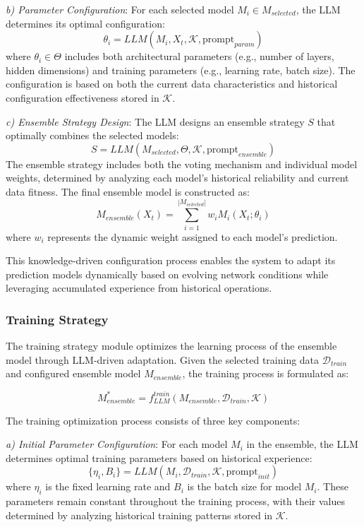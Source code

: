 \documentclass[conference]{IEEEtran}
\begin{document}
\textit{b) Parameter Configuration}: For each selected model $M_i \in M_{selected}$, the LLM determines its optimal configuration:
\begin{equation}
    \theta_i = LLM(M_i, X_t, \mathcal{K}, \text{prompt}_{param})
\end{equation}
where $\theta_i \in \Theta$ includes both architectural parameters (e.g., number of layers, hidden dimensions) and training parameters (e.g., learning rate, batch size). The configuration is based on both the current data characteristics and historical configuration effectiveness stored in $\mathcal{K}$.

\textit{c) Ensemble Strategy Design}: The LLM designs an ensemble strategy $S$ that optimally combines the selected models:
\begin{equation}
    S = LLM(M_{selected}, \Theta, \mathcal{K}, \text{prompt}_{ensemble})
\end{equation}
The ensemble strategy includes both the voting mechanism and individual model weights, determined by analyzing each model's historical reliability and current data fitness. The final ensemble model is constructed as:
\begin{equation}
    M_{ensemble}(X_t) = \sum_{i=1}^{|M_{selected}|} w_i M_i(X_t; \theta_i)
\end{equation}
where $w_i$ represents the dynamic weight assigned to each model's prediction.

This knowledge-driven configuration process enables the system to adapt its prediction models dynamically based on evolving network conditions while leveraging accumulated experience from historical operations.

\subsubsection{Training Strategy}
The training strategy module optimizes the learning process of the ensemble model through LLM-driven adaptation. Given the selected training data $\mathcal{D}_{train}$ and configured ensemble model $M_{ensemble}$, the training process is formulated as:

\begin{equation}
    M_{ensemble}^* = f_{LLM}^{train}(M_{ensemble}, \mathcal{D}_{train}, \mathcal{K})
\end{equation}

The training optimization process consists of three key components:

\textit{a) Initial Parameter Configuration}: For each model $M_i$ in the ensemble, the LLM determines optimal training parameters based on historical experience:
\begin{equation}
    \{\eta_i, B_i\} = LLM(M_i, \mathcal{D}_{train}, \mathcal{K}, \text{prompt}_{init})
\end{equation}
where $\eta_i$ is the fixed learning rate and $B_i$ is the batch size for model $M_i$. These parameters remain constant throughout the training process, with their values determined by analyzing historical training patterns stored in $\mathcal{K}$.
\end{document}
